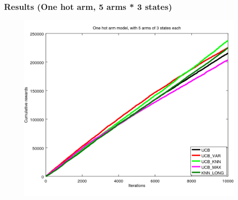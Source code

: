 \documentclass[french]{beamer}
\begin{document}
\begin{frame}
	\frametitle{Results (One hot arm, 5 arms * 3 states)}

	\begin{figure}[h]
		\begin{center}
			\vspace{-10pt}
			\includegraphics[width=1.05\textheight]{all_s_10000it.png}

			\vspace{-10pt}
		\end{center}
	\end{figure}
\end{frame}
\end{document}

